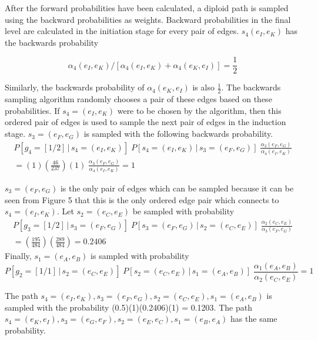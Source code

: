 \documentclass[a4paper,11pt,twoside,abstraction,titlepage]{article}
\begin{document}
\newpage

\noindent After the forward probabilities have been calculated, a diploid path is sampled using the backward probabilities as weights.  Backward probabilities in the final level are calculated in the initiation stage for every pair of edges.  $s_4(e_I,e_K)$ has the backwards probability 

\begin{equation*}
\alpha_4(e_I,e_K)/[\alpha_4(e_I,e_K) + \alpha_4(e_K,e_I)] = \frac{1}{2}
\end{equation*}
\vspace{1pt}

\noindent Similarly, the backwards probability of $\alpha_4(e_K,e_I)$ is also $\frac{1}{2}$.  The backwards sampling algorithm randomly chooses a pair of these edges based on these probabilities. If $s_4=(e_I,e_K)$ were to be chosen by the algorithm, then this ordered pair of edges is used to sample the next pair of edges in the induction stage.  $s_3 = (e_F,e_G)$ is sampled with the following backwards probability.
\begin{gather*}
P[g_4=[1/2] \,|\,s_4=(e_I,e_K)] \;P[s_4=(e_I,e_K)\,|\,s_3=(e_F,e_G)] \;\frac{\alpha_3(e_F,e_G)}{\alpha_4(e_I,e_K)}  \\
 = (1)\left(\frac{46}{237}\right)(1) \; \frac{\alpha_3(e_F,e_G)}{\alpha_4(e_I,e_K)} = 1
\end{gather*}

\vspace{2pt}
\noindent $s_3 = (e_F,e_G)$ is the only pair of edges which can be sampled because it can be seen from Figure 5 that this is the only ordered edge pair which connects to $s_4=(e_I,e_K)$.  Let $s_2 = (e_C, e_E)$ be sampled with probability
\begin{gather*}
P[g_3=[1/2] \,|\,s_3=(e_F,e_G)] \;P[s_3=(e_F,e_G)\,|\,s_2 = (e_C, e_E)] \;\frac{\alpha_2(e_C, e_E)}{\alpha_3(e_F,e_G)}  \\
 = \left(\frac{195}{484}\right) \!\! \left(\frac{289}{484}\right) = 0.2406
\end{gather*}
\vspace{1pt}
\noindent Finally, $s_1 = (e_A,e_B)$ is sampled with probability
\vspace{-5pt}
\begin{equation*}
P[g_2=[1/1] \,|\,s_2=(e_C,e_E)] \;P[s_2=(e_C,e_E)\,|\,s_1 = (e_A,e_B)] \;\frac{\alpha_1(e_A, e_B)}{\alpha_2(e_C,e_E)} = 1
\end{equation*}

\noindent The path $s_4=(e_I,e_K), s_3 = (e_F,e_G), s_2=(e_C,e_E), s_1 = (e_A,e_B)$ is sampled with the probability (0.5)(1)(0.2406)(1) = 0.1203.  The path  $s_4=(e_K,e_I), s_3 = (e_G,e_F), s_2=(e_E,e_C), s_1 = (e_B,e_A)$ has the same probability.
\end{document}
